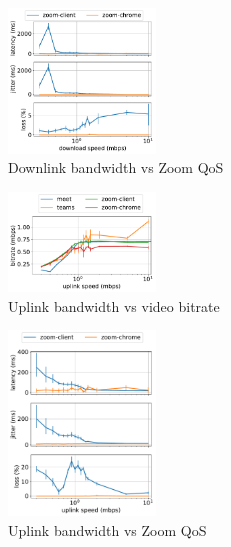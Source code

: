 \begin{figure}[]
    \includegraphics[width=0.35\textwidth,keepaspectratio]{figures/static/downlink_qos_zoom.pdf}
    \caption{Downlink bandwidth vs Zoom QoS}
    \label{fig:downlink_qos_zoom}
\end{figure}


\begin{figure}[]
    \includegraphics[width=0.35\textwidth,keepaspectratio]{figures/static/uplink_bitrate_meet_teams_zoom.pdf}
    \caption{Uplink bandwidth vs video bitrate}
    \label{fig:uplink_qos}
\end{figure}


\begin{figure}[]
    \includegraphics[width=0.35\textwidth,keepaspectratio]{figures/static/uplink_latency_zoom.pdf}
    \caption{Uplink bandwidth vs Zoom QoS}
    \label{fig:latency_video_qual}
\end{figure}

